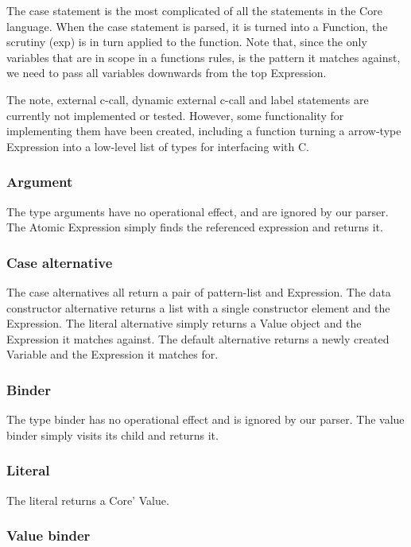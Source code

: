 The case statement is the most complicated of all the statements in the Core language.
When the case statement is parsed, it is turned into a Function, the scrutiny (exp) 
is in turn applied to the function. Note that, since the only variables that are in
scope in a functions rules, is the pattern it matches against, we need to pass all 
variables downwards from the top Expression.

The note, external c-call, dynamic external c-call and label statements are currently
not implemented or tested. However, some functionality for implementing them have been
created, including a function turning a arrow-type Expression into a low-level list
of types for interfacing with C.

\subsubsection*{Argument}

The type arguments have no operational effect, and are ignored by our parser.
The Atomic Expression simply finds the referenced expression and returns it.

\subsubsection*{Case alternative}

The case alternatives all return a pair of pattern-list and Expression. The
data constructor alternative returns a list with a single constructor element and
the Expression. The literal alternative simply returns a Value object and the 
Expression it matches against. The default alternative returns a newly created
Variable and the Expression it matches for.

\subsubsection*{Binder}

The type binder has no operational effect and is ignored by our parser. The 
value binder simply visits its child and returns it.

\subsubsection*{Literal}

The literal returns a Core' Value.


\subsubsection*{Value binder}

